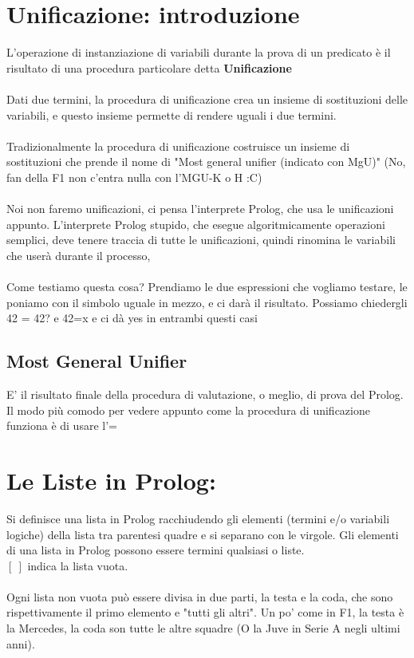 \documentclass[12pt, a4paper, openany, oneside]{book}
\begin{document}
\section{Unificazione: introduzione}
L'operazione di instanziazione di variabili durante la prova di un predicato è il 
risultato di una procedura particolare detta \textbf{Unificazione} \\ \\
Dati due termini, la procedura di unificazione crea un insieme di sostituzioni 
delle variabili, e questo insieme permette di rendere uguali i due termini. \\
\\ 
Tradizionalmente la procedura di unificazione costruisce un insieme di sostituzioni
che prende il nome di "Most general unifier (indicato con MgU)" (No, fan della F1
non c'entra nulla con l'MGU-K o H :C)
\\ \\ 
Noi non faremo unificazioni, ci pensa l'interprete Prolog, che usa le 
unificazioni appunto. L'interprete Prolog stupido, che esegue algoritmicamente
operazioni semplici, deve tenere traccia di tutte le unificazioni, quindi rinomina
le variabili che userà durante il processo,
\\ \\
Come testiamo questa cosa? Prendiamo le due espressioni che vogliamo testare, le
poniamo con il simbolo uguale in mezzo, e ci darà il risultato. Possiamo chiedergli
42 = 42? e 42=x e ci dà yes in entrambi questi casi
\subsection{Most General Unifier} 
E' il risultato finale della procedura di valutazione, o meglio, di prova del 
Prolog. \\
Il modo più comodo per vedere appunto come la procedura di unificazione funziona 
è di usare l'=
\section{Le Liste in Prolog: }
Si definisce una lista in Prolog racchiudendo gli elementi (termini e/o variabili
logiche) della lista tra parentesi quadre e si separano con le virgole.
Gli elementi di una lista in Prolog possono essere termini qualsiasi o liste. \\
$[~]$ indica la lista vuota.
\\ \\
Ogni lista non vuota può essere divisa in due parti, la testa e la coda, che sono
rispettivamente il primo elemento e "tutti gli altri". Un po' come in F1, la 
testa è la Mercedes, la coda son tutte le altre squadre (O la Juve in Serie A
negli ultimi anni).
\end{document}

